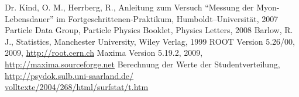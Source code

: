 \renewcommand{\refname}{Literatur und Programme}
\begin{thebibliography}{xxxxxx}
Dr. Kind, O. M., Herrberg, R., Anleitung zum Versuch ``Messung der
Myon-Lebensdauer'' im
Fortgeschrittenen-Praktikum, Humboldt–Universität, 2007
Particle Data Group, Particle Physics Booklet, Physics Letters, 2008
Barlow, R. J., Statistics, Manchester University, Wiley Verlag, 1999
ROOT Version 5.26/00, 2009, \href{http://root.cern.ch}{http://root.cern.ch}
Maxima Version 5.19.2, 2009, \href{http://maxima.sourceforge.net}{http://maxima.sourceforge.net}
Berechnung der Werte der Studentverteilung,\\ \href{http://psydok.sulb.uni-saarland.de/volltexte/2004/268/html/surfstat/t.htm}{http://psydok.sulb.uni-saarland.de/\\volltexte/2004/268/html/surfstat/t.htm}
\end{thebibliography}